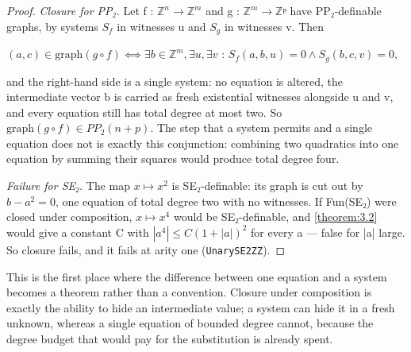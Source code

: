 \begin{proof}
\emph{Closure for PP₂.} Let f : $ℤ^{n} → ℤ^{m}$ and g : $ℤ^{m} → ℤᵖ$ have PP₂-definable graphs, by systems $S_{f}$ in witnesses u and $S_{g}$ in witnesses v. Then

$(a, c) ∈ \mathrm{graph}(g ∘ f) ⟺ ∃ b ∈ ℤ^{m}, ∃u, ∃v$ : $S_{f}(a, b, u) = 0 ∧ S_{g}(b, c, v) = 0$,

and the right-hand side is a single system: no equation is altered, the intermediate vector b is carried as fresh existential witnesses alongside u and v, and every equation still has total degree at most two. So $\mathrm{graph}(g ∘ f) ∈ PP_{2}(n+p)$. The step that a system permits and a single equation does not is exactly this conjunction: combining two quadratics into one equation by summing their squares would produce total degree four.

\emph{Failure for SE₂.} The map $x ↦ x^{2}$ is SE₂-definable: its graph is cut out by $b − a^{2} = 0$, one equation of total degree two with no witnesses. If Fun(SE₂) were closed under composition, $x ↦ x^{4}$ would be SE₂-definable, and \cref{theorem:3.2} would give a constant C with $|a^{4}| ≤ C(1+|a|)^{2}$ for every a — false for |a| large. So closure fails, and it fails at arity one (\texttt{UnarySE2ZZ}).

\end{proof}
This is the first place where the difference between one equation and a system becomes a theorem rather than a convention. Closure under composition is exactly the ability to hide an intermediate value; a system can hide it in a fresh unknown, whereas a single equation of bounded degree cannot, because the degree budget that would pay for the substitution is already spent.

